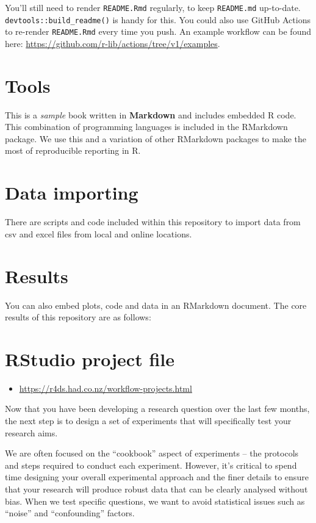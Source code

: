 \documentclass[
]{book}
\providecommand{\tightlist}{%
  \setlength{\itemsep}{0pt}\setlength{\parskip}{0pt}}
\begin{document}
You'll still need to render \texttt{README.Rmd} regularly, to keep \texttt{README.md} up-to-date. \texttt{devtools::build\_readme()} is handy for this. You could also use GitHub Actions to re-render \texttt{README.Rmd} every time you push. An example workflow can be found here: \url{https://github.com/r-lib/actions/tree/v1/examples}.

\hypertarget{tools}{%
\section{Tools}\label{tools}}

This is a \emph{sample} book written in \textbf{Markdown} and includes embedded R code. This combination of programming languages is included in the RMarkdown package. We use this and a variation of other RMarkdown packages to make the most of reproducible reporting in R.

\hypertarget{data-importing}{%
\section{Data importing}\label{data-importing}}

There are scripts and code included within this repository to import data from csv and excel files from local and online locations.

\hypertarget{results}{%
\section{Results}\label{results}}

You can also embed plots, code and data in an RMarkdown document. The core results of this repository are as follows:

\hypertarget{rstudio-project-file}{%
\section{RStudio project file}\label{rstudio-project-file}}

\begin{itemize}
\tightlist
\item
  \url{https://r4ds.had.co.nz/workflow-projects.html}
\end{itemize}

Now that you have been developing a research question over the last few months, the next step is to design a set of experiments that will specifically test your research aims.

We are often focused on the ``cookbook'' aspect of experiments -- the protocols and steps required to conduct each experiment. However, it's critical to spend time designing your overall experimental approach and the finer details to ensure that your research will produce robust data that can be clearly analysed without bias. When we test specific questions, we want to avoid statistical issues such as ``noise'' and ``confounding'' factors.
\end{document}
